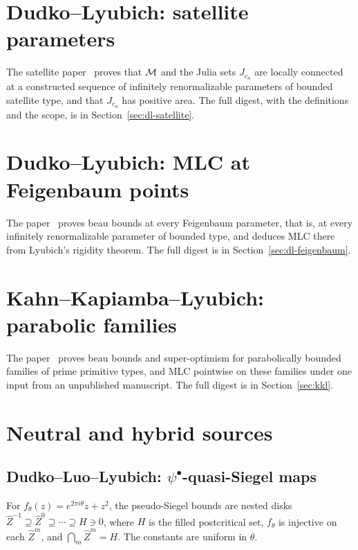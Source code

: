 \section{Dudko--Lyubich: satellite parameters}
\label{sec:digest-satellite}

The satellite paper~\cite{DudkoLyubichSatellite} proves that $\mathcal M$ and the Julia sets $J_{c_n}$ are locally connected at a
constructed sequence of infinitely renormalizable parameters of bounded satellite type, and that $J_{c_n}$ has positive area.
The full digest, with the definitions and the scope, is in Section~\ref{sec:dl-satellite}.

\section{Dudko--Lyubich: MLC at Feigenbaum points}
\label{sec:digest-feigenbaum}

The paper~\cite{DudkoLyubichFeigenbaum} proves beau bounds at every Feigenbaum parameter, that is, at every infinitely
renormalizable parameter of bounded type, and deduces MLC there from Lyubich's rigidity theorem.  The full digest is in
Section~\ref{sec:dl-feigenbaum}.

\section{Kahn--Kapiamba--Lyubich: parabolic families}
\label{sec:digest-kkl}

The paper~\cite{KahnKapiambaLyubich} proves beau bounds and super-optimism for parabolically bounded families of prime
primitive types, and MLC pointwise on these families under one input from an unpublished manuscript.  The full digest is
in Section~\ref{sec:kkl}.

\section{Neutral and hybrid sources}
\label{sec:digest-neutral-hybrid}

\subsection*{Dudko--Luo--Lyubich: $\psi^\bullet$-quasi-Siegel maps}

\begin{definition}
\label{def:pseudo-siegel}
For $f_\theta(z)=e^{2\pi i\theta}z+z^2$, the pseudo-Siegel bounds are nested disks
$\widehat Z^{-1}\supseteq\widehat Z^0\supseteq\cdots\supseteq H\ni0$, where $H$ is
the filled postcritical set, $f_\theta$ is injective on each $\widehat Z^m$, and
$\bigcap_m\widehat Z^m=H$.  The constants are uniform in $\theta$.
\end{definition}

